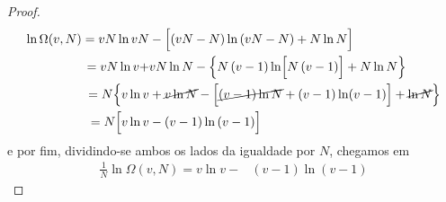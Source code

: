 \begin{sol}
\begin{enumerate}[label=\alph *)]
			\begin{proof}
				\begin{align}
					\begin{split}
						\ln\Omega(v,N)=vN\ln vN&-\Bigl[\left(vN-N\right)\ln\left(vN-N\right)+N\ln N\Bigr]\\
						=vN\ln v+&vN\ln N-\Bigl\{N\left(v-1\right)\ln \Bigl[N\left(v-1\right)\Bigr]+N\ln N\Bigr\}\\
						=N\Bigl\{v\ln v&+\cancel{v\ln N}-\Bigl[\cancel{\left(v-1\right)\ln N}+\left(v-1\right)\ln (v-1)\Bigr]+\cancel{\ln N}\Bigr\}\\
						=N\Bigl[v\ln v&-\left(v-1\right)\ln\left(v-1\right)\Bigr]		
					\end{split}
				\end{align}
				e por fim, dividindo-se ambos os lados da igualdade por $N$, chegamos em
				\begin{align}
						\frac{1}{N}\ln\Omega(v,N)=v\ln v-&\left(v-1\right)\ln\left(v-1\right)
				\end{align}
			\end{proof}
	\end{enumerate}
	
\end{sol}
